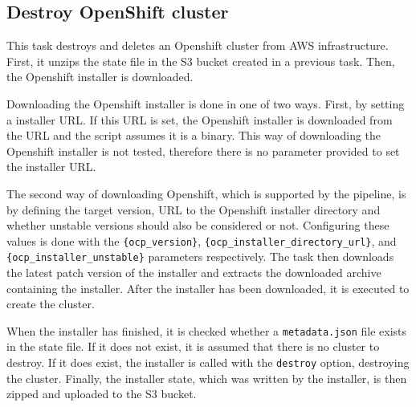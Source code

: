 \subsection{Destroy OpenShift cluster}\label{subsec:destroy-openshift-cluster}

This task destroys and deletes an Openshift cluster from AWS infrastructure.
First, it unzips the state file in the S3 bucket created in a previous task.
Then, the Openshift installer is downloaded.

Downloading the Openshift installer is done in one of two ways.
First, by setting a installer URL.
If this URL is set, the Openshift installer is downloaded from the URL and the script assumes it is a binary.
This way of downloading the Openshift installer is not tested, therefore there is no parameter provided to set the installer URL.

The second way of downloading Openshift, which is supported by the pipeline, is by defining the target version, URL to the Openshift installer directory and whether unstable versions should also be considered or not.
Configuring these values is done with the \verb|{ocp_version}|, \verb|{ocp_installer_directory_url}|, and \verb|{ocp_installer_unstable}| parameters respectively.
The task then downloads the latest patch version of the installer and extracts the downloaded archive containing the installer.
After the installer has been downloaded, it is executed to create the cluster.

When the installer has finished, it is checked whether a \verb|metadata.json| file exists in the state file.
If it does not exist, it is assumed that there is no cluster to destroy.
If it does exist, the installer is called with the \verb|destroy| option, destroying the cluster.
Finally, the installer state, which was written by the installer, is then zipped and uploaded to the S3 bucket.
